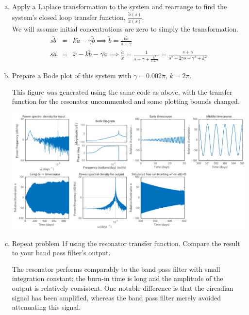 \documentclass{article}
\begin{document}
\begin{enumerate}[a)]
\setlength{\itemsep}{0pt}
\item Apply a Laplace transformation to the system and rearrange to find the system's closed loop transfer function, $\frac{\tilde{a}(s)}{\tilde{x}(s)}$.\\

{\color{red} We will assume initial concentrations are zero to simply the transformation.
\begin{eqnarray*}
s\tilde{b} & = & k\tilde{a} - \gamma \tilde{b} \implies \tilde{b}  = \frac{k \tilde{a}}{s + \gamma}\\
s\tilde{a} & = & \tilde{x} - k\tilde{b} - \gamma \tilde{a} \implies \frac{\tilde{a}}{\tilde{x}} = \frac{1}{s + \gamma + \frac{k^2}{s+\gamma}} = \frac{s + \gamma}{s^2 + 2\gamma s + \gamma^2 + k^2}
\end{eqnarray*}
}

\item Prepare a Bode plot of this system with $\gamma=0.002 \pi $, $k=2\pi$.\\

{\color{red}
This figure was generated using the same code as above, with the transfer function for the resonator uncommented and some plotting bounds changed.

\begin{center}
\includegraphics[width=\textwidth]{resonator.pdf}
\end{center}

}


\item Repeat problem 1f using the resonator transfer function. Compare the result to your band pass filter's output.\\

{\color{red}
The resonator performs comparably to the band pass filter with small integration constant: the burn-in time is long and the amplitude of the output is relatively consistent. One notable difference is that the circadian signal has been amplified, whereas the band pass filter merely avoided attenuating this signal.

}

\end{enumerate}
\end{document}
